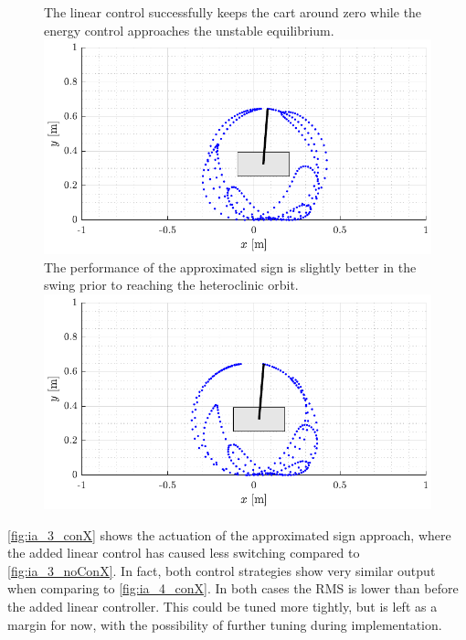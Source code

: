 %
\begin{figure}[H]
  \hspace{-10pt}
  \captionbox
  {
    The linear control successfully keeps the cart around zero while the energy control approaches the unstable equilibrium.
    \label{fig:ani_3_conX}
  }
  {
    \hspace{-1cm}
    \includegraphics[width=.46\textwidth]{figures/ani_3_conX}
  }
  \hspace{20pt}
  \captionbox 
  {
    The performance of the approximated sign is slightly better in the swing prior to reaching the heteroclinic orbit.
    \label{fig:ani_4_conX}
  }
  {
    \hspace{-1cm}
    \includegraphics[width=.46\textwidth]{figures/ani_4_conX}
  }  
\end{figure}
%
\autoref{fig:ia_3_conX} shows the actuation of the approximated sign approach, where the added linear control has caused less switching compared to \autoref{fig:ia_3_noConX}. In fact, both control strategies show very similar output when comparing to \autoref{fig:ia_4_conX}. In both cases the RMS is lower than before the added linear controller. This could be tuned more tightly, but is left as a margin for now, with the possibility of further tuning during implementation.
%
